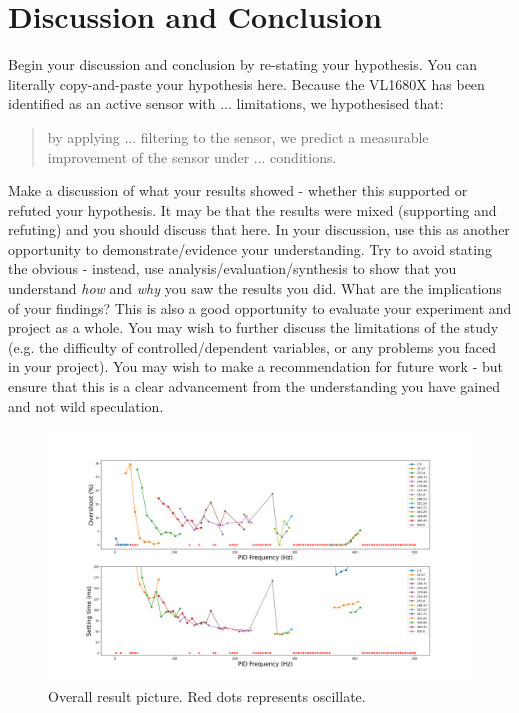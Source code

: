\documentclass[conference]{IEEEtran}
\begin{document}
\section{Discussion and Conclusion}
Begin your discussion and conclusion by re-stating your hypothesis.  You can literally copy-and-paste your hypothesis here.  
Because the VL1680X has been identified as an active sensor with ... limitations, we hypothesised that:
\begin{quote}
    by applying ... filtering to the sensor, we predict a measurable improvement of the sensor under ... conditions.  
\end{quote}
Make a discussion of what your results showed - whether this supported or refuted your hypothesis.  It may be that the results were mixed (supporting and refuting) and you should discuss that here. In your discussion, use this as another opportunity to demonstrate/evidence your understanding. Try to avoid stating the obvious - instead, use analysis/evaluation/synthesis to show that you understand \emph{how} and \emph{why} you saw the results you did.  What are the implications of your findings?  
This is also a good opportunity to evaluate your experiment and project as a whole.  You may wish to further discuss the limitations of the study (e.g. the difficulty of controlled/dependent variables, or any problems you faced in your project).  You may wish to make a recommendation for future work - but ensure that this is a clear advancement from the understanding you have gained and not wild speculation.


 


\newpage
\onecolumn
\appendix
\begin{figure}[htbp]
\centerline{\includegraphics[width=1.3\linewidth]{Report/Pic/Appendix.png}}
\caption{Overall result picture. Red dots represents oscillate.}%
\label{fig_appendix}
\end{figure}
\end{document}
